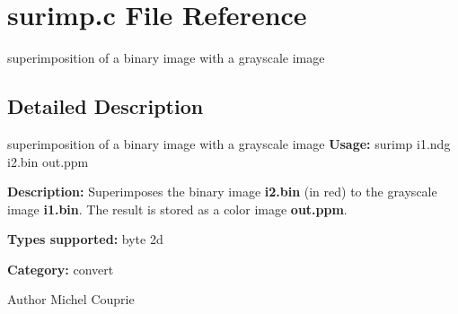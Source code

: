 \section{surimp.c File Reference}
\label{surimp_8c}


superimposition of a binary image with a grayscale image  




\subsection{Detailed Description}
superimposition of a binary image with a grayscale image {\bfseries Usage:} surimp i1.ndg i2.bin out.ppm

{\bfseries Description:} Superimposes the binary image {\bfseries i2.bin} (in red) to the grayscale image {\bfseries i1.bin}. The result is stored as a color image {\bfseries out.ppm}.

{\bfseries Types supported:} byte 2d

{\bfseries Category:} convert

\begin{DoxyAuthor}{Author}
Michel Couprie 
\end{DoxyAuthor}
